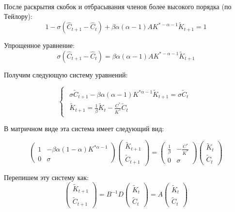\documentclass[a4paper,12pt]{article}
\begin{document}
{После раскрытия скобок и отбрасывания членов более высокого порядка (по Тейлору):
\[
1 - \sigma (\hat{C}_{t+1} - \hat{C}_t) + \beta \alpha (\alpha - 1) A K^{*-\alpha-1} \tilde{K}_{t+1} = 1
\]

Упрощенное уравнение:
\[
\sigma (\hat{C}_{t+1} - \hat{C}_t) = \beta \alpha (\alpha - 1) A K^{*-\alpha-1} \tilde{K}_{t+1}
\]

Получим следующую систему уравнений:

\begin{equation}
    \begin{cases}
    \begin{alignedat}{2}
    \sigma \tilde{C}_{t+1} - \beta \alpha (\alpha - 1) K^{* \alpha - 1} \tilde{K}_{t+1} = \sigma \tilde{C}_t \\
    \tilde{K}_{t+1} = \frac{1}{\beta} \tilde{K}_t - \frac{C^*}{K^*} \tilde{C}_t
    \end{alignedat}
    \end{cases}
    \label{eq:system_dynamic_3}
\end{equation}


В матричном виде эта система имеет следующий вид:

\[
\begin{pmatrix}
1 & -\beta \alpha (1-\alpha) K^{*\alpha-1} \\
0 & \sigma
\end{pmatrix}
\begin{pmatrix}
\tilde{K}_{t+1} \\
\tilde{C}_{t+1}
\end{pmatrix}
=
\begin{pmatrix}
\frac{1}{\beta} & -\frac{C^*}{K^*} \\
0 & \sigma
\end{pmatrix}
\begin{pmatrix}
\tilde{K}_t \\
\tilde{C}_t
\end{pmatrix}
\]

Перепишем эту систему как:
\[
\begin{pmatrix}
\tilde{K}_{t+1} \\
\tilde{C}_{t+1}
\end{pmatrix}
= B^{-1}D
\begin{pmatrix}
\tilde{K}_t \\
\tilde{C}_t
\end{pmatrix}
= A
\begin{pmatrix}
\tilde{K}_t \\
\tilde{C}_t
\end{pmatrix}
\]

}
\end{document}

